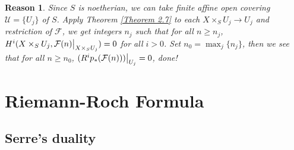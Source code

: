\documentclass{ctexart}
\newtheorem{reason}{Reason}[section]
\begin{document}
\begin{reason}
    Since $S$ is noetherian, we can take finite affine open covering $\mathcal{U} = \{U_{j}\}$ of $S$.
    Apply Theorem \ref{Theorem 2.7} to each $X \times_{S} U_{j} \rightarrow U_{j}$ and restriction of $\mathcal{F}$,
    we get integers $n_{j}$ such that for all $n \ge n_{j}$, $H^{i}(X \times_{S} U_{j}, \mathcal{F}(n)\big{|}_{X \times_{S} U_{j}}) = 0$ for all $i > 0$.
    Set $n_{0} = \max_{j} \{n_{j}\}$, then we see that for all $n \ge n_{0}$,
    $(R^{i}p_{\ast}(\mathcal{F}(n)))\big{|}_{U_{j}} = 0$, done! 
\end{reason}

\section{Riemann-Roch Formula}
\label{section:Riemann-Roch_Formula}

\subsection{Serre's duality}
\label{subsection:Riemann-Roch_Formula_Serre's_duality}
\end{document}
